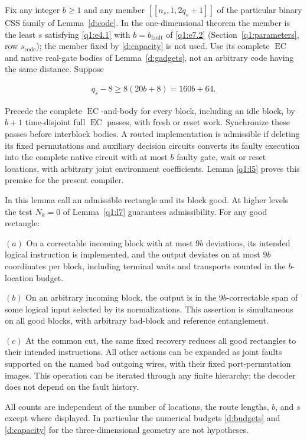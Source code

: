 \begin{lemma}\label{q1:l4}


Fix any integer \(b\ge 1\) and any member \([[n_{s},1,2q_{s}+1]]\) of the particular binary CSS family of Lemma~\ref{d:code}. In the one-dimensional theorem the member is the least \(s\) satisfying \eqref{q1:e4.1} with \(b=b_{\mathrm{fault}}\) of \eqref{q1:e7.2} (Section~\ref{q1:parameters}, row \(s_{\mathrm{code}}\)); the member fixed by \eqref{d:capacity} is not used. Use its complete \(\operatorname{EC}\) and native real-gate bodies of Lemma~\ref{d:gadgets}, not an arbitrary code having the same distance. Suppose

\begin{equation}\label{q1:e4.1}
\begin{gathered}
q_{s}-8 \ge  8(20b+8) = 160b+64.
\end{gathered}
\end{equation}

Precede the complete \(\operatorname{EC}\)-and-body for every block, including an idle block, by \(b+1\) time-disjoint full \(\operatorname{EC}\) passes, with fresh or reset work. Synchronize these passes before interblock bodies. A routed implementation is admissible if deleting its fixed permutations and auxiliary decision circuits converts its faulty execution into the complete native circuit with at most \(b\) faulty gate, wait or reset locations, with arbitrary joint environment coefficients. Lemma \ref{q1:l5} proves this premise for the present compiler.

In this lemma call an admissible rectangle and its block good.
At higher levels the test \(N_k=0\) of Lemma~\ref{q1:l7}
guarantees admissibility. For any good rectangle:

\((a)\) On a correctable incoming block with at most \(9b\) deviations, its intended logical instruction is implemented, and the output deviates on at most \(9b\) coordinates per block, including terminal waits and transports counted in the \(b\)-location budget.

\((b)\) On an arbitrary incoming block, the output is in the \(9b\)-correctable span of some logical input selected by its normalizations. This assertion is simultaneous on all good blocks, with arbitrary bad-block and reference entanglement.

\((c)\) At the common cut, the same fixed recovery reduces all good rectangles to their intended instructions. All other actions can be expanded as joint faults supported on the named bad outgoing wires, with their fixed port-permutation images. This operation can be iterated through any finite hierarchy; the decoder does not depend on the fault history.

All counts are independent of the number of locations, the route lengths, \(b\), and \(s\) except where displayed. In particular the numerical budgets \eqref{d:budgets} and \eqref{d:capacity} for the three-dimensional geometry are not hypotheses.

\end{lemma}
